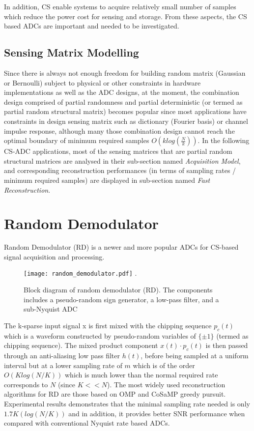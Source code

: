 In addition, CS enable systems to acquire relatively small number of samples which reduce the power cost for sensing and storage. From these aspects, the CS based ADCs are important and needed to be investigated. 

\subsection{Sensing Matrix Modelling}
Since there is always not enough freedom for building random matrix (Gaussian or Bernoulli) subject to physical or other constraints in hardware implementations as well as the ADC designs, at the moment, the combination design comprised of partial randomness and partial deterministic (or termed as partial random structural matrix) becomes popular since most applications have constraints in design sensing matrix such as dictionary (Fourier basis) or channel impulse response, although many those combination design cannot reach the optimal boundary of minimum required samples $O(k log(\frac{N}{k}))$. In the following CS-ADC applications, most of the sensing matrices that are partial random structural matrices are analysed in their sub-section named \emph{Acquisition Model}, and corresponding reconstruction performances (in terms of sampling rates / minimum required samples) are displayed in sub-section named \emph{Fast Reconstruction}. 

\section{Random Demodulator}

Random Demodulator (RD) \cite{tropp2010beyond} is a newer and more popular ADCs for CS-based signal acquisition and processing.

\begin{figure}[!t]
\centering
\texttt{[image: random\_demodulator.pdf]}
\DeclareGraphicsExtensions.
\caption{Block diagram of random demodulator (RD). The components includes a pseudo-random sign generator, a low-pass filter, and a sub-Nyquist ADC}\label{RD}
\end{figure}

The k-sparse input signal x is first mixed with the chipping sequence $p_c(t)$ which is a waveform constructed by pseudo-random variables of $\{\pm 1\}$ (termed as chipping sequence). The mixed product component $x(t) \cdot p_c(t)$ is then passed through an anti-aliasing low pass filter $h(t)$, before being sampled at a uniform interval but at a lower sampling rate of $m$ which is of the order $O(K log(N/K))$ which is much lower than the normal required rate corresponds to $N$ (since $K << N$). The most widely used reconstruction algorithms for RD are those based on OMP and CoSaMP greedy pursuit. Experimental results \cite{tropp2010beyond} demonstrates that the minimal sampling rate needed is only $1.7K(log(N/K))$ and in addition, it provides better SNR performance when compared with conventional Nyquist rate based ADCs.


